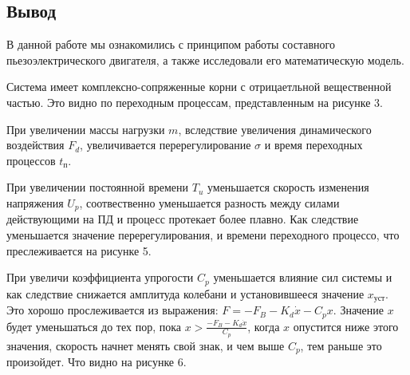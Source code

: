 \documentclass[a4paper, 12pt]{article}
\begin{document}
\newpage
\begin{center}
\section*{Вывод}
\end{center} \par
В данной работе мы ознакомились с принципом работы составного пьезоэлектрического двигателя, а также исследовали его математическую модель.\par
Система имеет комплексно-сопряженные корни с отрицаетльной вещественной частью. Это видно по переходным процессам, представленным на рисунке 3. \par
При увеличении массы нагрузки $m$, вследствие увеличения динамического воздействия $F_d$, увеличивается перерегулирование $\sigma$ и время переходных процессов $t_\text{п}$. \par
При увеличении постоянной времени $T_u$ уменьшается скорость изменения напряжения $U_p$, соотвественно уменьшается разность между силами действующими на ПД и процесс протекает более плавно. Как следствие уменьшается значение перерегулирования, и времени переходного процессо, что преслеживается на рисунке 5. \par
При увеличи коэффициента упрогости $C_p$ уменьшается влияние сил системы и как следствие снижается амплитуда колебани и установившееся значение $x_\text{уст}$. Это хорошо прослеживается из выражения: $F = -F_B - K_d\dot{x} - C_px$. Значение $x$ будет уменьшаться до тех пор, пока $x > \displaystyle\frac{-F_B - K_d\dot{x}}{C_p}$, когда $x$ опустится ниже этого значения, скорость начнет менять свой знак, и чем выше $C_p$, тем раньше это произойдет. Что видно на рисунке 6.
\end{document}
